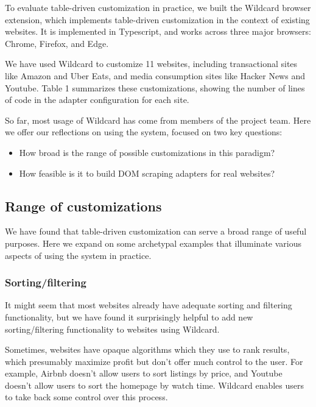 \documentclass[sigplan,screen,10pt,anonymous,review]{acmart}
\providecommand{\tightlist}{%
  \setlength{\itemsep}{0pt}\setlength{\parskip}{0pt}}
\begin{document}
To evaluate table-driven customization in practice, we built the
Wildcard browser extension, which implements table-driven customization
in the context of existing websites. It is implemented in Typescript,
and works across three major browsers: Chrome, Firefox, and Edge.

We have used Wildcard to customize 11 websites, including transactional
sites like Amazon and Uber Eats, and media consumption sites like Hacker
News and Youtube. Table 1 summarizes these customizations, showing the
number of lines of code in the adapter configuration for each site.

So far, most usage of Wildcard has come from members of the project
team. Here we offer our reflections on using the system, focused on two
key questions:

\begin{itemize}
\tightlist
\item
  How broad is the range of possible customizations in this paradigm?
\item
  How feasible is it to build DOM scraping adapters for real websites?
\end{itemize}

\hypertarget{range-of-customizations}{%
\subsection{Range of customizations}\label{range-of-customizations}}

We have found that table-driven customization can serve a broad range of
useful purposes. Here we expand on some archetypal examples that
illuminate various aspects of using the system in practice.

\hypertarget{sortingfiltering}{%
\subsubsection{Sorting/filtering}\label{sortingfiltering}}

It might seem that most websites already have adequate sorting and
filtering functionality, but we have found it surprisingly helpful to
add new sorting/filtering functionality to websites using Wildcard.

Sometimes, websites have opaque algorithms which they use to rank
results, which presumably maximize profit but don't offer much control
to the user. For example, Airbnb doesn't allow users to sort listings by
price, and Youtube doesn't allow users to sort the homepage by watch
time. Wildcard enables users to take back some control over this
process.
\end{document}
